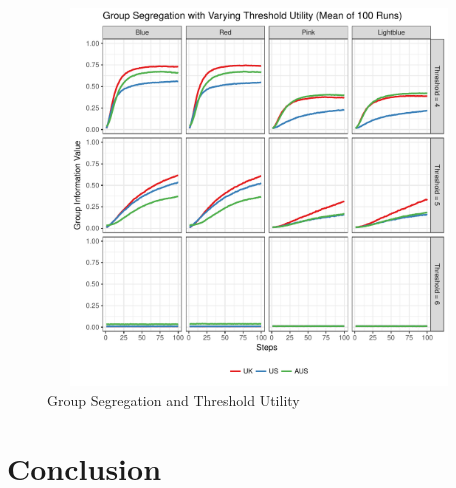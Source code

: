 \documentclass[12pt, a4paper]{article}
\begin{document}
\begin{figure}[bp!]
	\centering
	\caption{Group Segregation and Threshold Utility}
	\includegraphics[height=10cm,width=16cm]{./Plots/all_th_grp_ratios.pdf}
\end{figure}



\section{\label{sec_conc}Conclusion}




\newpage

%
%
\end{document}
